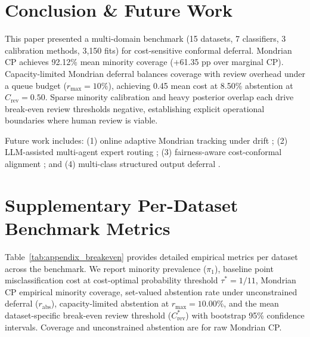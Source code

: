 \documentclass{ieeetj}
\begin{document}
\section{Conclusion \& Future Work}
\label{sec:conclusion}

This paper presented a multi-domain benchmark (15 datasets, 7 classifiers, 3 calibration methods, 3,150 fits) for cost-sensitive conformal deferral. Mondrian CP achieves 92.12\% mean minority coverage (+61.35 pp over marginal CP). Capacity-limited Mondrian deferral balances coverage with review overhead under a queue budget ($r_{\max}=10\%$), achieving 0.45 mean cost at 8.50\% abstention at $C_{\mathrm{rev}}=0.50$. Sparse minority calibration and heavy posterior overlap each drive break-even review thresholds negative, establishing explicit operational boundaries where human review is viable.

Future work includes: (1) online adaptive Mondrian tracking under drift \cite{gibbs2021adaptive}; (2) LLM-assisted multi-agent expert routing \cite{straitouri2024decision}; (3) fairness-aware cost-conformal alignment \cite{romano2020equalized}; and (4) multi-class structured output deferral \cite{cauchois2021knowing}.


\appendices
\renewcommand{\thetable}{A.\arabic{table}}
\setcounter{table}{0}

\section{Supplementary Per-Dataset Benchmark Metrics}
\label{sec:appendix}

Table~\ref{tab:appendix_breakeven} provides detailed empirical metrics per dataset across the benchmark. We report minority prevalence ($\pi_1$), baseline point misclassification cost at cost-optimal probability threshold $\tau^* = 1/11$, Mondrian CP empirical minority coverage, set-valued abstention rate under unconstrained deferral ($r_{\mathrm{abs}}$), capacity-limited abstention at $r_{\max}=10.00\%$, and the mean dataset-specific break-even review threshold ($C_{\mathrm{rev}}^*$) with bootstrap 95\% confidence intervals. Coverage and unconstrained abstention are for raw Mondrian CP.
\end{document}
